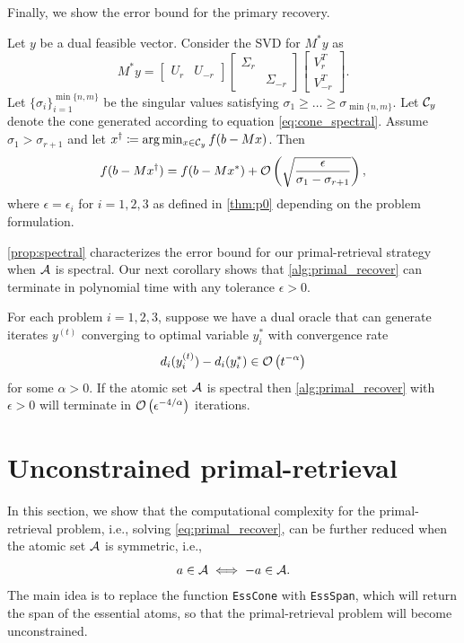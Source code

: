 Finally, we show the error bound for the primary recovery. 
\begin{proposition} \label{prop:spectral}
     Let $y$ be a dual feasible vector. Consider the SVD for $M^*y$ as 
     \[ M^*y = 
\begin{bmatrix}
    U_r & U_{-r}
\end{bmatrix}
\begin{bmatrix}
    \Sigma_r &          \\ 
             &  \Sigma_{-r}
\end{bmatrix}
\begin{bmatrix}
    V_r^T \\ 
    V_{-r}^T
\end{bmatrix}.
\] 
Let $\{\sigma_i\}_{i=1}^{\min\{n,m\}}$ be the singular values satisfying 
$\sigma_1 \geq \dots \geq \sigma_{\min\{n,m\}}$.
Let $\mathcal{C}_y$ denote the cone generated according to equation \eqref{eq:cone_spectral}. Assume $\sigma_1 > \sigma_{r+1}$ and let $x^\dagger \coloneqq \arg\min_{ x \in \mathcal{C}_y } f(b - Mx)$. Then
\[
    f( b - M x^\dagger ) = f( b - M x^* ) + \mathcal{O}\left( \sqrt{ \frac{\epsilon}{ \sigma_1 - \sigma_{r+1} } } \right),
\]
where $\epsilon = \epsilon_i$ for $i = 1, 2, 3$ as defined in \autoref{thm:p0} depending on the problem formulation.
\end{proposition}

\autoref{prop:spectral} characterizes the error bound for our primal-retrieval strategy when $\mathcal{A}$ is spectral. Our next corollary shows that \autoref{alg:primal_recover} can terminate in polynomial time with any tolerance $\epsilon > 0$.

\begin{corollary} \label{coro:spectral}
    For each problem $i= 1, 2, 3$, suppose we have a dual oracle that can generate iterates $y^{(t)}$ converging to optimal variable $y_i^*$ with convergence rate
    \[d_i(y_i^{(t)}) - d_i(y_i^*) \in \mathcal{O}\left( t^{-\alpha} \right)\]
    for some $\alpha > 0$. If the atomic set $\mathcal{A}$ is spectral then \autoref{alg:primal_recover} with $\epsilon>0$ will terminate in $\mathcal{O}\left(\epsilon^{-4/\alpha}\right)$ iterations. 
\end{corollary}

\section{Unconstrained primal-retrieval}
In this section, we show that the computational complexity for the primal-retrieval problem, i.e., solving \eqref{eq:primal_recover}, can be further reduced when the atomic set $\mathcal{A}$ is symmetric, i.e., 
\[a\in\mathcal{A} \iff -a\in\mathcal{A}.\]
The main idea is to replace the function \texttt{EssCone} with \texttt{EssSpan}, which will return the span of the essential atoms, so that the primal-retrieval problem will become unconstrained. 

